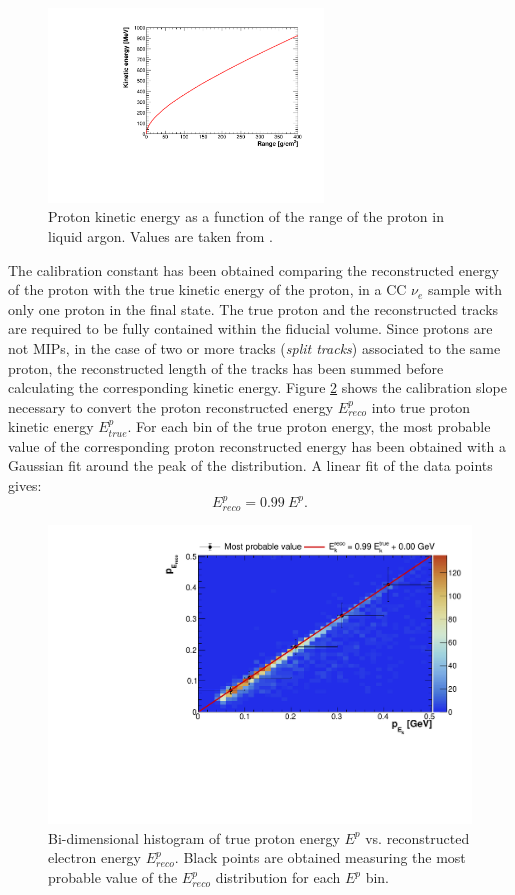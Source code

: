\begin{figure}[htbp]
\centering
\includegraphics[width=0.65\textwidth]{figures/proton.pdf}
\caption{Proton kinetic energy as a function of the range of the proton in liquid argon. Values are taken from \cite{pstar}.} 
\label{fig:proton}
\end{figure}

The calibration constant has been obtained comparing the reconstructed energy of the proton with the true kinetic energy of the proton, in a CC $\nu_{e}$ sample with only one proton in the final state. The true proton and the reconstructed tracks are required to be fully contained within the fiducial volume. Since protons are not MIPs, in the case of two or more tracks (\emph{split tracks}) associated to the same proton, the reconstructed length of the tracks has been summed before calculating the corresponding kinetic energy.
Figure \ref{fig:pcalib} shows the calibration slope necessary to convert the proton reconstructed energy $E_{reco}^{p}$ into true proton kinetic energy $E_{true}^{p}$. For each bin of the true proton energy, the most probable value of the corresponding proton reconstructed energy has been obtained with a Gaussian fit around the peak of the distribution. A linear fit of the data points gives:
\begin{equation}
E_{reco}^{p} = 0.99~E^{p}.
\end{equation}

\begin{figure}[!htbp]
\centering
\includegraphics[width=0.65\columnwidth]{figures/pcalib.pdf}
\caption{Bi-dimensional histogram of true proton energy $E^{p}$ vs. reconstructed electron energy $E_{reco}^{p}$. Black points are obtained measuring the most probable value of the $E_{reco}^{p}$ distribution for each $E^{p}$ bin.}
\label{fig:pcalib}
\end{figure}


